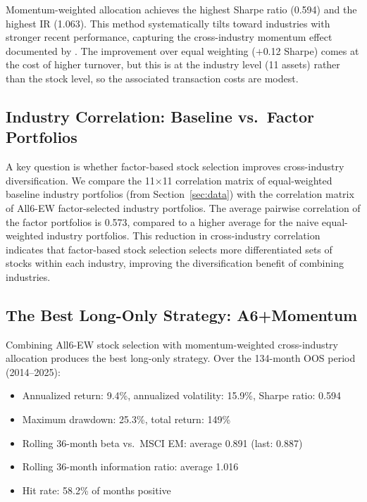 \documentclass[12pt,a4paper]{article}
\begin{document}
Momentum-weighted allocation achieves the highest Sharpe ratio (0.594) and the highest IR (1.063). This method systematically tilts toward industries with stronger recent performance, capturing the cross-industry momentum effect documented by \citet{asness2013}. The improvement over equal weighting ($+$0.12 Sharpe) comes at the cost of higher turnover, but this is at the industry level (11 assets) rather than the stock level, so the associated transaction costs are modest.

\subsection{Industry Correlation: Baseline vs.\ Factor Portfolios}

A key question is whether factor-based stock selection improves cross-industry diversification. We compare the 11$\times$11 correlation matrix of equal-weighted baseline industry portfolios (from Section~\ref{sec:data}) with the correlation matrix of All6-EW factor-selected industry portfolios. The average pairwise correlation of the factor portfolios is 0.573, compared to a higher average for the naive equal-weighted industry portfolios. This reduction in cross-industry correlation indicates that factor-based stock selection selects more differentiated sets of stocks within each industry, improving the diversification benefit of combining industries.

\subsection{The Best Long-Only Strategy: A6+Momentum}

Combining All6-EW stock selection with momentum-weighted cross-industry allocation produces the best long-only strategy. Over the 134-month OOS period (2014--2025):

\begin{itemize}
    \item Annualized return: 9.4\%, annualized volatility: 15.9\%, Sharpe ratio: 0.594
    \item Maximum drawdown: 25.3\%, total return: 149\%
    \item Rolling 36-month beta vs.\ MSCI EM: average 0.891 (last: 0.887)
    \item Rolling 36-month information ratio: average 1.016
    \item Hit rate: 58.2\% of months positive
\end{itemize}
\end{document}
